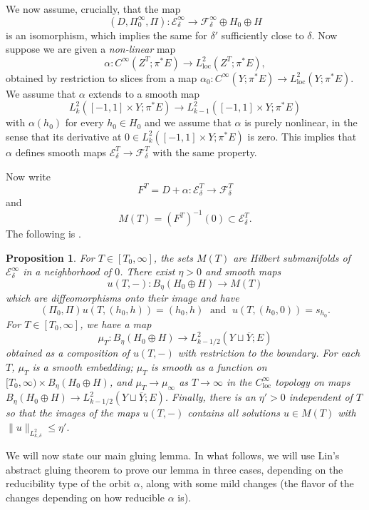 \documentclass{memo-l}
\newcommand{\pE}{\pi^* \! E}
\newtheorem{proposition}[theorem]{Proposition}
\theoremstyle{definition}
\theoremstyle{remark}
\numberwithin{section}{chapter}
\numberwithin{equation}{chapter}
\begin{document}
We now assume, crucially, that the map $$(D, \Pi^\infty_0, \Pi): \mathcal E^\infty_\delta \to \mathcal F^\infty_\delta \oplus H_0 \oplus H$$ is an isomorphism, which implies the same for $\delta'$ sufficiently close to $\delta$. Now suppose we are given a \emph{non-linear} map 
$$\alpha: C^\infty(Z^T;\pE) \to L^2_{\text{loc}}(Z^T;\pE),$$ 
obtained by restriction to slices from a map $\alpha_0: C^\infty(Y;\pE) \to L^2_{\text{loc}}(Y;\pE)$. We assume that $\alpha$ extends to a smooth map 
$$L^2_k([-1,1] \times Y; \pE) \to L^2_{k-1}([-1,1] \times Y; \pE)$$ 
with $\alpha(h_0)$ for every $h_0 \in H_0$ and we assume that $\alpha$ is purely nonlinear, in the sense that its derivative at $0 \in L^2_k([-1,1] \times Y;\pE)$ is zero. This implies that $\alpha$ defines smooth maps $\mathcal E_\delta^T \to \mathcal F_\delta^T$ with the same property.

Now write $$F^T = D + \alpha: \mathcal E^T_\delta \to \mathcal F^T_\delta$$ and $$M(T) = \left(F^T\right)^{-1}(0) \subset \mathcal E_\delta^T.$$ The following is \cite[Proposition~3.5.15]{Lin}.

\begin{proposition}For $T \in [T_0, \infty]$, the sets $M(T)$ are Hilbert submanifolds of $\mathcal E^\infty_\delta$ in a neighborhood of $0$. There exist $\eta > 0$ and smooth maps $$u(T, -): B_\eta(H_0 \oplus H) \to M(T)$$ which are diffeomorphisms onto their image and have $$(\Pi_0, \Pi) u(T, (h_0, h)) = (h_0, h) \; \text{ and } \; u(T, (h_0, 0)) = s_{h_0}.$$ For $T \in [T_0, \infty]$, we have a map $$\mu_T: B_\eta(H_0 \oplus H) \to L^2_{k-1/2}(Y \sqcup \overline Y;E)$$ obtained as a composition of $u(T, -)$ with restriction to the boundary. For each $T$, $\mu_T$ is a smooth embedding; $\mu_T$ is smooth as a function on $[T_0, \infty) \times B_\eta(H_0 \oplus H)$, and $\mu_T \to \mu_\infty$ as $T \to \infty$ in the $C^\infty_{\text{loc}}$ topology on maps $B_\eta(H_0 \oplus H) \to L^2_{k-1/2}(Y \sqcup \overline Y;E)$. Finally, there is an $\eta' > 0$ independent of $T$ so that the images of the maps $u(T, -)$ contains all solutions $u \in M(T)$ with $\|u\|_{L^2_{k,\delta}} \leq \eta'.$
\end{proposition}

We will now state our main gluing lemma. In what follows, we will use Lin's abstract gluing theorem to prove our lemma in three cases, depending on the reducibility type of the orbit $\alpha$, along with some mild changes (the flavor of the changes depending on how reducible $\alpha$ is).
\end{document}
